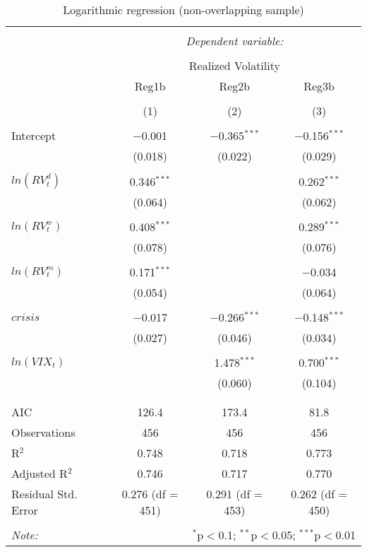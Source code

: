 
\begin{table}[!htbp] \centering 
  \caption{Logarithmic regression (non-overlapping sample)} 
  \label{} 
\begin{tabular}{@{\extracolsep{5pt}}lccc} 
\\[-1.8ex]\hline 
\hline \\[-1.8ex] 
 & \multicolumn{3}{c}{\textit{Dependent variable:}} \\ 
\cline{2-4} 
\\[-1.8ex] & \multicolumn{3}{c}{Realized Volatility} \\ 
 & Reg1b & Reg2b & Reg3b \\ 
\\[-1.8ex] & (1) & (2) & (3)\\ 
\hline \\[-1.8ex] 
 Intercept & $-$0.001 & $-$0.365$^{***}$ & $-$0.156$^{***}$ \\ 
  & (0.018) & (0.022) & (0.029) \\ 
  & & & \\ 
 $ln(RV^{d}_{t})$ & 0.346$^{***}$ &  & 0.262$^{***}$ \\ 
  & (0.064) &  & (0.062) \\ 
  & & & \\ 
 $ln(RV^{w}_{t})$ & 0.408$^{***}$ &  & 0.289$^{***}$ \\ 
  & (0.078) &  & (0.076) \\ 
  & & & \\ 
 $ ln(RV^{m}_{t})$ & 0.171$^{***}$ &  & $-$0.034 \\ 
  & (0.054) &  & (0.064) \\ 
  & & & \\ 
 $crisis$ & $-$0.017 & $-$0.266$^{***}$ & $-$0.148$^{***}$ \\ 
  & (0.027) & (0.046) & (0.034) \\ 
  & & & \\ 
 $ln(VIX_{t})$ &  & 1.478$^{***}$ & 0.700$^{***}$ \\ 
  &  & (0.060) & (0.104) \\ 
  & & & \\ 
\hline \\[-1.8ex] 
AIC & 126.4 & 173.4 & 81.8 \\ 
Observations & 456 & 456 & 456 \\ 
R$^{2}$ & 0.748 & 0.718 & 0.773 \\ 
Adjusted R$^{2}$ & 0.746 & 0.717 & 0.770 \\ 
Residual Std. Error & 0.276 (df = 451) & 0.291 (df = 453) & 0.262 (df = 450) \\ 
\hline 
\hline \\[-1.8ex] 
\textit{Note:}  & \multicolumn{3}{r}{$^{*}$p$<$0.1; $^{**}$p$<$0.05; $^{***}$p$<$0.01} \\ 
\end{tabular} 
\end{table} 
